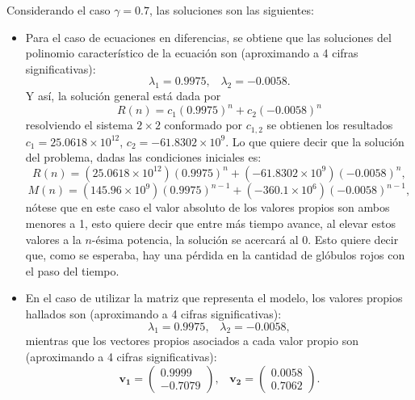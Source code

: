 Considerando el caso $\gamma = 0.7$, las soluciones son las siguientes:
\begin{itemize}
    \item Para el caso de ecuaciones en diferencias, se obtiene que las soluciones del polinomio característico de la ecuación son (aproximando a 4 cifras significativas):
        $$\lambda_1 = 0.9975,\;\;\; \lambda_2 = -0.0058.$$
        Y así, la solución general está dada por 
        $$R(n)=c_1(0.9975)^n+c_2(-0.0058)^n$$
        resolviendo el sistema $2\times 2$ conformado por $c_{1,2}$ se obtienen los resultados $c_1=25.0618\times 10^{12}$, $c_2 = -61.8302\times 10^{9}$. Lo que quiere decir que la solución del problema, dadas las condiciones iniciales es:
        $$R(n)=(25.0618\times 10^{12})(0.9975)^n+(-61.8302\times 10^{9})(-0.0058)^n,$$
        $$M(n)=(145.96\times 10^{9})(0.9975)^{n-1}+(-360.1\times 10^{6})(-0.0058)^{n-1},$$
        nótese que en este caso el valor absoluto de los valores propios son ambos menores a 1, esto quiere decir que entre más tiempo avance, al elevar estos valores a la $n$-ésima potencia, la solución se acercará al 0. Esto quiere decir que, como se esperaba, hay una pérdida en la cantidad de glóbulos rojos con el paso del tiempo.
    \item En el caso de utilizar la matriz que representa el modelo, los valores propios hallados son (aproximando a 4 cifras significativas):
        $$\lambda_1 = 0.9975, \;\;\; \lambda_2 = -0.0058,$$
        mientras que los vectores propios asociados a cada valor propio son (aproximando a 4 cifras significativas):
        $$\mathbf{v_1}=\begin{pmatrix}
            0.9999  \\ 
            -0.7079
            \end{pmatrix},\;\;\;  \mathbf{v_2}=\begin{pmatrix}
            0.0058  \\
            0.7062
            \end{pmatrix}.$$

\end{itemize}

